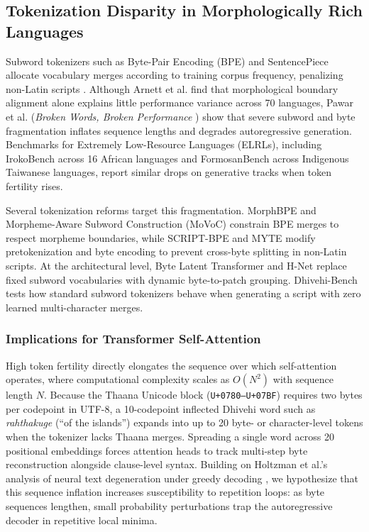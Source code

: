 \documentclass[acmsmall,review,anonymous]{acmart}
\begin{document}
\subsection{Tokenization Disparity in Morphologically Rich Languages}
Subword tokenizers such as Byte-Pair Encoding (BPE) \cite{sennrich_neural_2016} and SentencePiece \cite{kudo_sentencepiece_2018} allocate vocabulary merges according to training corpus frequency, penalizing non-Latin scripts \cite{ahia_all_2023, petrov_language_2023, rust_how_2021}. Although Arnett et al. \cite{arnett_evaluating_2025} find that morphological boundary alignment alone explains little performance variance across 70 languages, Pawar et al. (\textit{Broken Words, Broken Performance} \cite{pawar_broken_2025}) show that severe subword and byte fragmentation inflates sequence lengths and degrades autoregressive generation. Benchmarks for Extremely Low-Resource Languages (ELRLs), including IrokoBench \cite{adelani_irokobench_2025} across 16 African languages and FormosanBench \cite{lin_formosanbench_2025} across Indigenous Taiwanese languages, report similar drops on generative tracks when token fertility rises.

Several tokenization reforms target this fragmentation. MorphBPE \cite{asgari_morphbpe_2026} and Morpheme-Aware Subword Construction (MoVoC) \cite{teklehaymanot_movoc_2025} constrain BPE merges to respect morpheme boundaries, while SCRIPT-BPE \cite{land_bpe_2025} and MYTE \cite{limisiewicz_myte_2024} modify pretokenization and byte encoding to prevent cross-byte splitting in non-Latin scripts. At the architectural level, Byte Latent Transformer \cite{pagnoni_byte_2025} and H-Net \cite{hwang_dynamic_2025} replace fixed subword vocabularies with dynamic byte-to-patch grouping. Dhivehi-Bench tests how standard subword tokenizers behave when generating a script with zero learned multi-character merges.

\subsubsection{Implications for Transformer Self-Attention}
High token fertility directly elongates the sequence over which self-attention operates, where computational complexity scales as $O(N^2)$ with sequence length $N$. Because the Thaana Unicode block (\texttt{U+0780--U+07BF}) requires two bytes per codepoint in UTF-8, a 10-codepoint inflected Dhivehi word such as \textit{rahthakuge} (``of the islands'') expands into up to 20 byte- or character-level tokens when the tokenizer lacks Thaana merges. Spreading a single word across 20 positional embeddings forces attention heads to track multi-step byte reconstruction alongside clause-level syntax. Building on Holtzman et al.'s analysis of neural text degeneration under greedy decoding \cite{holtzman_curious_2020}, we hypothesize that this sequence inflation increases susceptibility to repetition loops: as byte sequences lengthen, small probability perturbations trap the autoregressive decoder in repetitive local minima.
\end{document}
